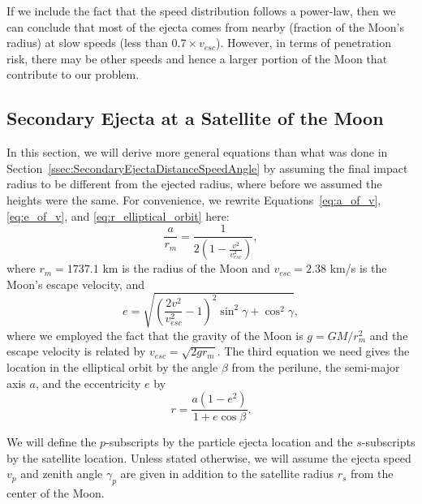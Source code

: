 \documentclass{hitec}
\numberwithin{equation}{section}
\begin{document}
If we include the fact that the speed distribution follows a power-law, then we can conclude that most of the ejecta comes from nearby (fraction of the Moon's radius) at slow speeds (less than $0.7\times v_{esc}$). However, in terms of penetration risk, there may be other speeds and hence a larger portion of the Moon that contribute to our problem.



\subsection{Secondary Ejecta at a Satellite of the Moon}
\label{ssec:SecondaryEjectaAtASatelliteOfTheMoon}

In this section, we will derive more general equations than what was done in Section~\ref{ssec:SecondaryEjectaDistanceSpeedAngle} by assuming the final impact radius to be different from the ejected radius, where before we assumed the heights were the same. For convenience, we rewrite Equations~\eqref{eq:a_of_v}, \eqref{eq:e_of_v}, and \eqref{eq:r_elliptical_orbit} here:
\begin{equation}\label{eq:a_of_v-repeat}
\frac{a}{r_m} = \frac{1}{2\left(1-\frac{v^2}{v_{esc}^2}\right)},
\end{equation}
where $r_m = 1737.1$ km is the radius of the Moon and $v_{esc} = 2.38$ km/s is the Moon's escape velocity, and
\begin{equation}\label{eq:e_of_v-repeat}
e = \sqrt{\left(\frac{2v^2}{v_{esc}^2}-1\right)^2\sin^2\gamma + \cos^2\gamma},
\end{equation}
where we employed the fact that the gravity of the Moon is $g = GM/r_m^2$ and the escape velocity is related by $v_{esc} = \sqrt{2gr_m}$. The third equation we need gives the location in the elliptical orbit by the angle $\beta$ from the perilune, the semi-major axis $a$, and the eccentricity $e$ by
\begin{equation}\label{eq:r_elliptical_orbit-repeat}
r = \frac{a(1-e^2)}{1+e\cos\beta}.
\end{equation}

We will define the $p$-subscripts by the particle ejecta location and the $s$-subscripts by the satellite location. Unless stated otherwise, we will assume the ejecta speed $v_p$ and zenith angle $\gamma_p$ are given in addition to the satellite radius $r_s$ from the center of the Moon.
\end{document}

